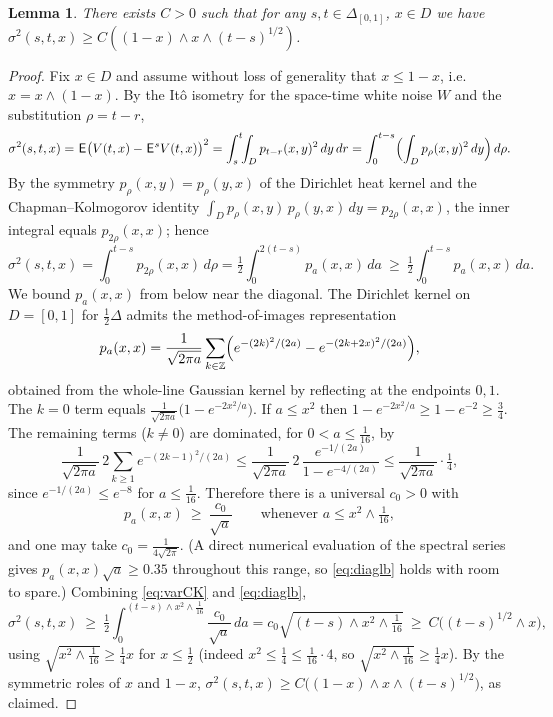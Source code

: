 \documentclass[12pt]{article}
\newtheorem{lemma}[theorem]{Lemma}
\theoremstyle{definition}
\DeclareMathOperator{\1}{\mathbbm{1}}%
\def\E{\hskip.15ex\mathsf{E}\hskip.10ex}
\renewcommand{\ge}{\geqslant}
\renewcommand{\le}{\leqslant}
\newcommand{\Z}{\mathbb{Z}}
\begin{document}
\begin{lemma}\label{L:fkb} There exists $C>0$ such that for any $s,t\in\Delta_{[0,1]}$, $x\in D$ we have 
$\sigma^2(s,t,x)\ge  C ((1-x)\wedge x \wedge (t-s)^{1/2})$.
\end{lemma}


\begin{proof}
Fix $x\in D$ and assume without loss of generality that $x\le 1-x$, i.e. $x=x\wedge(1-x)$.
By the It\^o isometry for the space-time white noise $W$ and the substitution $\rho=t-r$,
\begin{equation}\label{eq:varform}
\sigma^2(s,t,x)=\E\bigl(V(t,x)-\E^sV(t,x)\bigr)^2
=\int_s^t\!\!\int_D p_{t-r}(x,y)^2\,dy\,dr
=\int_0^{t-s}\Bigl(\int_D p_\rho(x,y)^2\,dy\Bigr)\,d\rho .
\end{equation}
By the symmetry $p_\rho(x,y)=p_\rho(y,x)$ of the Dirichlet heat kernel and the
Chapman--Kolmogorov identity $\int_D p_\rho(x,y)\,p_\rho(y,x)\,dy=p_{2\rho}(x,x)$,
the inner integral equals $p_{2\rho}(x,x)$; hence
\begin{equation}\label{eq:varCK}
\sigma^2(s,t,x)=\int_0^{t-s}p_{2\rho}(x,x)\,d\rho
=\tfrac12\int_0^{2(t-s)}p_a(x,x)\,da
\ \ge\ \tfrac12\int_0^{t-s}p_a(x,x)\,da .
\end{equation}
We bound $p_a(x,x)$ from below near the diagonal. The Dirichlet kernel on $D=[0,1]$ for
$\tfrac12\Delta$ admits the method-of-images representation
\[
p_a(x,x)=\frac1{\sqrt{2\pi a}}\sum_{k\in\Z}\Bigl(e^{-(2k)^2/(2a)}-e^{-(2k+2x)^2/(2a)}\Bigr),
\]
obtained from the whole-line Gaussian kernel by reflecting at the endpoints $0,1$. The
$k=0$ term equals $\frac1{\sqrt{2\pi a}}\bigl(1-e^{-2x^2/a}\bigr)$. If $a\le x^2$ then
$1-e^{-2x^2/a}\ge 1-e^{-2}\ge\tfrac34$. The remaining terms ($k\ne0$) are dominated, for
$0<a\le\frac1{16}$, by
\[
\frac1{\sqrt{2\pi a}}\,2\sum_{k\ge1}e^{-(2k-1)^2/(2a)}
\le \frac1{\sqrt{2\pi a}}\,2\,\frac{e^{-1/(2a)}}{1-e^{-4/(2a)}}\le \frac1{\sqrt{2\pi a}}\cdot\tfrac14,
\]
since $e^{-1/(2a)}\le e^{-8}$ for $a\le\frac1{16}$. Therefore there is a universal $c_0>0$ with
\begin{equation}\label{eq:diaglb}
p_a(x,x)\ \ge\ \frac{c_0}{\sqrt a}\qquad\text{whenever } a\le x^2\wedge\tfrac1{16},
\end{equation}
and one may take $c_0=\tfrac{1}{4\sqrt{2\pi}}$. (A direct numerical evaluation of the
spectral series gives $p_a(x,x)\sqrt a\ge 0.35$ throughout this range, so \eqref{eq:diaglb}
holds with room to spare.) Combining \eqref{eq:varCK} and \eqref{eq:diaglb},
\[
\sigma^2(s,t,x)\ \ge\ \tfrac12\int_0^{(t-s)\wedge x^2\wedge\frac1{16}}\frac{c_0}{\sqrt a}\,da
=c_0\sqrt{(t-s)\wedge x^2\wedge\tfrac1{16}}
\ \ge\ C\bigl((t-s)^{1/2}\wedge x\bigr),
\]
using $\sqrt{x^2\wedge\frac1{16}}\ge \tfrac14 x$ for $x\le\tfrac12$ (indeed $x^2\le\frac14\le\frac1{16}\cdot4$,
so $\sqrt{x^2\wedge\frac1{16}}\ge \tfrac14 x$). By the symmetric roles of $x$ and $1-x$,
$\sigma^2(s,t,x)\ge C\bigl((1-x)\wedge x\wedge (t-s)^{1/2}\bigr)$, as claimed.
\end{proof}
\end{document}
